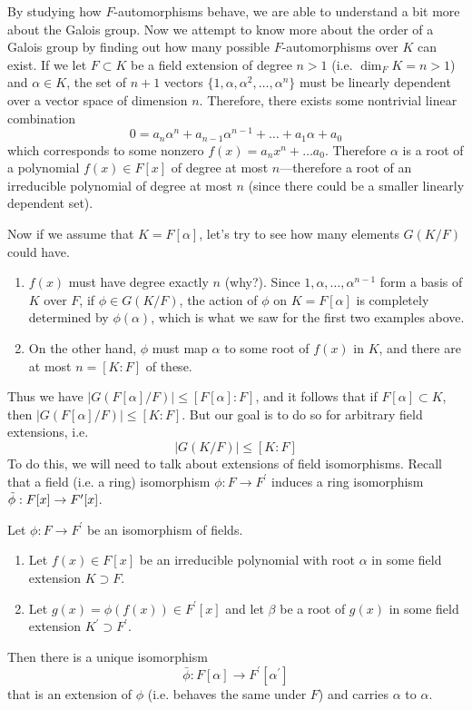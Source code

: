   By studying how $F$-automorphisms behave, we are able to understand a bit more about the Galois group. Now we attempt to know more about the order of a Galois group by finding out how many possible $F$-automorphisms over $K$ can exist. If we let $F \subset K$ be a field extension of degree $n >1$ (i.e. $\dim_F K = n > 1$) and $\alpha \in K$, the set of $n+1$ vectors $\{1, \alpha, \alpha^2, \ldots, \alpha^n\}$ must be linearly dependent over a vector space of dimension $n$. Therefore, there exists some nontrivial linear combination 
  \begin{equation}
    0 = a_n \alpha^n + a_{n-1} \alpha^{n-1} + \ldots + a_1 \alpha + a_0
  \end{equation} 
  which corresponds to some nonzero $f(x) = a_n x^n + \ldots a_0$. Therefore $\alpha$ is a root of a polynomial $f(x) \in F[x]$ of degree at most $n$---therefore a root of an irreducible polynomial of degree at most $n$ (since there could be a smaller linearly dependent set). 

  Now if we assume that $K = F[\alpha]$, let's try to see how many elements $G(K/F)$ could have. 
  \begin{enumerate}
    \item $f(x)$ must have degree exactly $n$ (why?). Since $1, \alpha, \ldots, \alpha^{n-1}$ form a basis of $K$ over $F$, if $\phi \in G(K/F)$, the action of $\phi$ on $K = F[\alpha]$ is completely determined by $\phi(\alpha)$, which is what we saw for the first two examples above. 
    \item On the other hand, $\phi$ must map $\alpha$ to some root of $f(x)$ in $K$, and there are at most $n = [K:F]$ of these. 
  \end{enumerate}
  Thus we have $|G(F[\alpha]/F)| \leq [F[\alpha]:F]$, and it follows that if $F[\alpha] \subset K$, then $|G(F[\alpha]/F)| \leq [K:F]$. But our goal is to do so for arbitrary field extensions, i.e. 
  \begin{equation}
    |G(K/F)| \leq [K:F]
  \end{equation} 
  To do this, we will need to talk about extensions of field isomorphisms. Recall that a field (i.e. a ring) isomorphism $\phi: F \to F^\prime$ induces a ring isomorphism $\Tilde{\phi}: F[x] \to F^\prime [x]$. 


  \begin{theorem}
    Let $\phi: F \to F^\prime$ be an isomorphism of fields.
    \begin{enumerate}
      \item Let $f(x) \in F[x]$ be an irreducible polynomial with root $\alpha$ in some field extension $K \supset F$.
      \item Let $g(x) = \phi(f(x)) \in F^\prime[x]$ and let $\beta$ be a root of $g(x)$ in some field extension $K^\prime \supset F^\prime$. 
    \end{enumerate}
    Then there is a unique isomorphism  
    \begin{equation}
      \bar{\phi} : F[\alpha] \to F^\prime [\alpha^\prime]
    \end{equation}
    that is an extension of $\phi$ (i.e. behaves the same under $F$) and carries $\alpha$ to $\alpha$. 
  \end{theorem}

